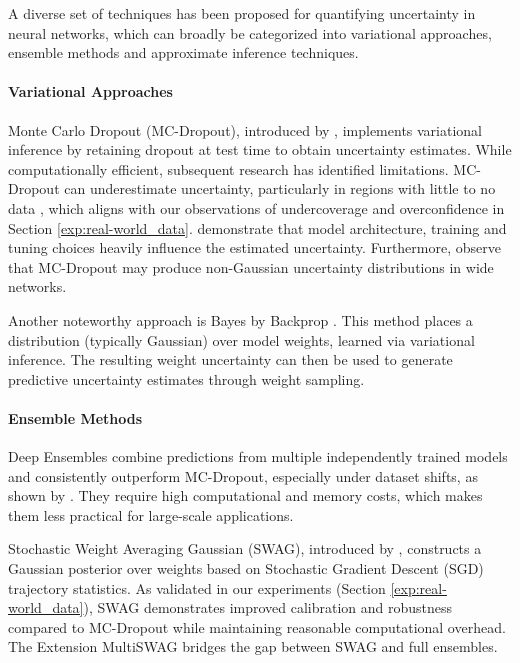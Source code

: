 
A diverse set of techniques has been proposed for quantifying uncertainty in neural networks, which can
broadly be categorized into variational approaches, ensemble methods and approximate inference techniques.

\paragraph{Variational Approaches}
Monte Carlo Dropout (MC-Dropout), introduced by \citet{gal2016mcdropout}, implements variational
inference by retaining dropout at test time to obtain uncertainty estimates. While computationally
efficient, subsequent research has identified limitations. MC-Dropout can underestimate uncertainty,
particularly in regions with little to no data \citep{osband2016}, which aligns with our observations of
undercoverage and overconfidence in Section \ref{exp:real-world_data}. \citet{verdoja2021behaviormcdropout}
demonstrate that model architecture, training and tuning choices heavily influence the estimated
uncertainty. Furthermore, \citet{sicking2020characteristicsmcdropout} observe that MC-Dropout may produce
non-Gaussian uncertainty distributions in wide networks.

Another noteworthy approach is Bayes by Backprop \citep{blundell2015bayesbybackprop}. This method
places a distribution (typically Gaussian) over model weights, learned via variational inference.
The resulting weight uncertainty can then be used to generate predictive uncertainty estimates
through weight sampling.

\paragraph{Ensemble Methods}
Deep Ensembles \citep{lakshminarayanan2017preduncw/deepensembles} combine predictions from multiple
independently trained models and consistently outperform MC-Dropout, especially under dataset shifts,
as shown by \citet{fort2020deepensembles}. They require high computational and memory costs, which makes
them less practical for large-scale applications.

Stochastic Weight Averaging Gaussian (SWAG), introduced by \citet{maddox2019swag}, constructs a Gaussian
posterior over weights based on Stochastic Gradient Descent (SGD) trajectory statistics. As validated in
our experiments (Section \ref{exp:real-world_data}), SWAG demonstrates improved calibration and robustness
compared to MC-Dropout while maintaining reasonable computational overhead. The Extension MultiSWAG
\citep{onal2024multiswag} bridges the gap between SWAG and full ensembles.

